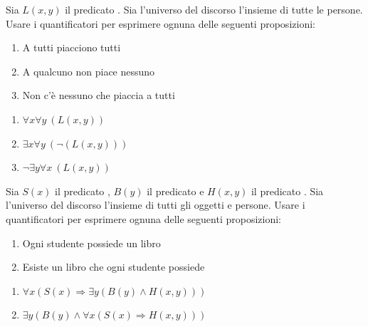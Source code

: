 \begin{esercizio}
Sia $L(x,y)$ il predicato . Sia l'universo del discorso l'insieme di tutte le persone. Usare i quantificatori per esprimere ognuna delle seguenti proposizioni: 	
\begin{enumerate}
    \item A tutti piacciono tutti
    \item A qualcuno non piace nessuno
    \item Non c'è nessuno che piaccia a tutti 
\end{enumerate}
\end{esercizio}


\begin{soluzione}
\begin{enumerate}
    \item $\forall x \forall y \ (L(x,y))$
    \item $\exists x \forall y \ (\neg (L(x,y)))$
    \item $\neg \exists y \forall x \ (L(x,y))$
\end{enumerate}
\end{soluzione}

\begin{esercizio}
Sia $S(x)$ il predicato , $B(y)$ il predicato  e $H(x,y)$ il predicato . Sia l'universo del discorso l'insieme di tutti gli oggetti e persone. Usare i quantificatori per esprimere ognuna delle seguenti proposizioni: 
	
\begin{enumerate}
    \item Ogni studente possiede un libro
    \item Esiste un libro che ogni studente possiede
\end{enumerate}
\end{esercizio}
\begin{soluzione}
\begin{enumerate}
    \item $\forall x (S(x) \Rightarrow \exists y (B(y) \wedge H(x,y)))$\newline
    \item $\exists y (B(y) \wedge \forall x ( S(x) \Rightarrow H(x,y) ))$\newline
\end{enumerate}
\end{soluzione}	

